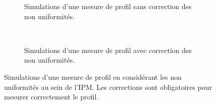 \begin{figure}[!ht]
	\begin{subfigure}[t]{0.5\textwidth}
		
		\caption[]{Simulations d'une mesure de profil sans correction des non uniformités.}
		\label{sumfr:fig:Field_a}
	\end{subfigure}
	~
	\begin{subfigure}[t]{0.5\textwidth}
		
		\caption[]{Simulations d'une mesure de profil avec correction des non uniformités.}
		\label{sumfr:fig:Field_b}
	\end{subfigure}
  \caption[]{Simulations d'une mesure de profil en considérant les non uniformités au sein de l'IPM. Les corrections sont obligatoires pour mesurer correctement le profil.}
	\label{sumfr:fig:Field}
\end{figure}

